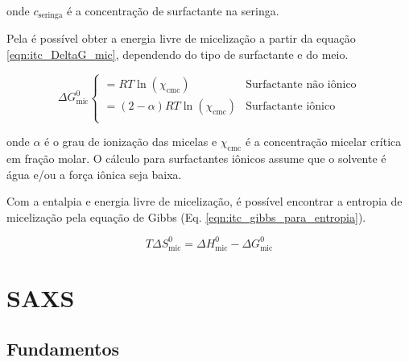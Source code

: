 		\noindent onde \(c_{\mathrm{seringa}}\) é a concentração de surfactante na seringa.
		
		Pela \cmc{} é possível obter a energia livre de micelização a partir da equação \ref{eqn:itc_DeltaG_mic}, dependendo do tipo de surfactante e do meio.
		
		\begin{equation}
			\Delta G_{\textrm{mic}}^0
			\begin{cases}
			= RT\ln(\chi_{\textrm{cmc}})      & \textrm{Surfactante não iônico}      \\
			= (2-\alpha)RT\ln(\chi_{\textrm{cmc}}) & \textrm{Surfactante iônico}					\\
			\end{cases}
			\label{eqn:itc_DeltaG_mic}
		\end{equation} 
		
		\noindent onde \(\alpha\) é o grau de ionização das micelas e \(\chi_{\mathrm{cmc}}\) é a concentração micelar crítica em fração molar. O cálculo para surfactantes iônicos assume que o solvente é água e/ou a força iônica seja baixa.
		
		Com a entalpia e energia livre de micelização, é possível encontrar a entropia de micelização pela equação de Gibbs (Eq. \ref{eqn:itc_gibbs_para_entropia}).
		
		\begin{equation}
			T\Delta S^0_{\textrm{mic}} = \Delta H^0_{\textrm{mic}} - \Delta G^0_{\textrm{mic}}
			\label{eqn:itc_gibbs_para_entropia}
		\end{equation}


	\chapter{SAXS}  
		\section{Fundamentos} 
				
		
